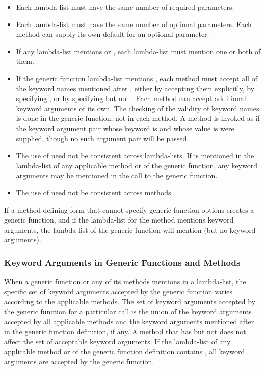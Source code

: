 \begin{itemize}

\item Each lambda-list must have the same number of required
parameters.

\item Each lambda-list must have the same number of optional
parameters.  Each method can supply its own default for an optional
parameter.

\item If any lambda-list mentions  or , each
lambda-list must mention one or both of them.

\item If the generic function lambda-list mentions , each
method must accept all of the keyword names mentioned after ,
either by accepting them explicitly, by specifying 
, or by specifying  but not .
Each method can accept additional keyword arguments of its own.  The
checking of the validity of keyword names is done in the generic
function, not in each method. A method is invoked as if the keyword
argument pair whose  keyword is  and whose value
is  were supplied, though no such argument pair will be passed.

\item The use of  need not be consistent
across lambda-lists.  If  is mentioned in 
the lambda-list of any applicable method or of the generic function,
any keyword arguments may be mentioned in the call to the
generic function.

\item The use of  need not be consistent across methods.
\end{itemize}


If a method-defining form that cannot specify generic function options
creates a generic function, and if the lambda-list for the method
mentions keyword arguments, the lambda-list of the generic function
will mention  (but no keyword arguments).


\subsubsection{Keyword Arguments in Generic Functions and Methods}

When a generic function or any of its methods mentions  in
a lambda-list, the specific set of keyword arguments accepted by the
generic function varies according to the applicable methods.  The set
of keyword arguments accepted by the generic function for a particular
call is the union of the keyword arguments accepted by all applicable
methods and the keyword arguments mentioned after  in the
generic function definition, if any.  A method that has 
but not  does not affect the set of acceptable keyword
arguments.  If the lambda-list of any applicable method or of the
generic function definition contains , all
keyword arguments are accepted by the generic function.

